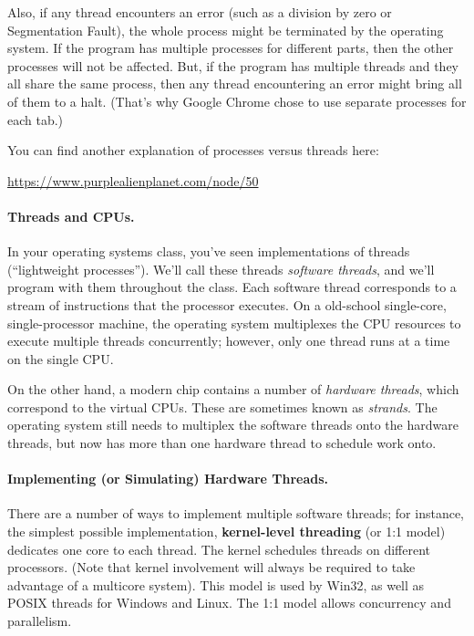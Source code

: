 \documentclass[a4paper]{report}
\begin{document}
Also, if any thread encounters an error (such as a division by zero or Segmentation Fault), the whole process might be terminated by the operating system. If the program has multiple processes for different parts, then the other processes will not be affected. But, if the program has multiple threads and they all share the same process, then any thread encountering an error might bring all of them to a halt. (That's why Google Chrome chose to use separate processes for each tab.)



You can find another explanation of processes versus threads here:
\begin{center}
  \url{https://www.purplealienplanet.com/node/50}
\end{center}

\paragraph{Threads and CPUs.} In your operating systems class,
you've seen implementations of threads (``lightweight processes'').
We'll call these threads \emph{software threads}, and we'll program
with them throughout the class. Each software thread corresponds to a
stream of instructions that the processor executes. On a old-school
single-core, single-processor machine, the operating system
multiplexes the CPU resources to execute multiple threads
concurrently; however, only one thread runs at a time on the single
CPU.

On the other hand, a modern chip contains a number of \emph{hardware
threads}, which correspond to the virtual CPUs. These are sometimes
known as \emph{strands}. The operating system still needs to 
multiplex the software threads onto the hardware threads, but now has
more than one hardware thread to schedule work onto.



\paragraph{Implementing (or Simulating) Hardware Threads.} 
There are a number of ways to implement multiple software threads; for
instance, the simplest possible implementation, {\bf kernel-level
threading} (or 1:1 model) dedicates one core to each thread. The kernel schedules threads
on different processors. (Note that kernel involvement will always be required to
take advantage of a multicore system). This model is used by Win32, as well as
POSIX threads for Windows and Linux. The 1:1 model allows concurrency and parallelism.
\end{document}
